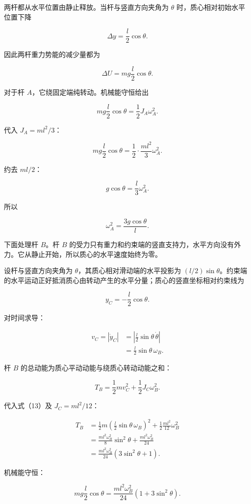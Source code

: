 \documentclass[12pt,a4paper,UTF8]{ctexart}
\begin{document}
两杆都从水平位置由静止释放。当杆与竖直方向夹角为 \(\theta\)
时，质心相对初始水平位置下降

\[
\Delta y=\frac l2\cos\theta. \tag{6}
\]

因此两杆重力势能的减少量都为

\[
\Delta U=mg\frac l2\cos\theta. \tag{7}
\]

对于杆 \(A\)，它绕固定端纯转动。机械能守恒给出

\[
mg\frac l2\cos\theta
=\frac12J_A\omega_A^2. \tag{8}
\]

代入 \(J_A=ml^2/3\)：

\[
mg\frac l2\cos\theta
=\frac12\cdot\frac{ml^2}{3}\omega_A^2. \tag{9}
\]

约去 \(ml/2\)：

\[
g\cos\theta=\frac l3\omega_A^2. \tag{10}
\]

所以

\[
\omega_A^2=\frac{3g\cos\theta}{l}. \tag{11}
\]

下面处理杆 \(B\)。杆 \(B\)
的受力只有重力和约束端的竖直支持力，水平方向没有外力。它从静止开始，所以质心的水平速度始终为零。

设杆与竖直方向夹角为 \(\theta\)，其质心相对滑动端的水平投影为
\((l/2)\sin\theta\)。约束端的水平运动正好抵消质心由转动产生的水平分量；质心的竖直坐标相对约束线为

\[
y_C=-\frac l2\cos\theta. \tag{12}
\]

对时间求导：

\[
\begin{aligned}
v_C
=|\dot y_C|
&=\left|\frac l2\sin\theta\,\dot\theta\right|\\
&=\frac l2\sin\theta\,\omega_B.
\end{aligned} \tag{13}
\]

杆 \(B\) 的总动能为质心平动动能与绕质心转动动能之和：

\[
T_B=\frac12mv_C^2+\frac12J_C\omega_B^2. \tag{14}
\]

代入式（13）及 \(J_C=ml^2/12\)：

\[
\begin{aligned}
T_B
&=\frac12m\left(\frac l2\sin\theta\,\omega_B\right)^2
+\frac12\frac{ml^2}{12}\omega_B^2\\
&=\frac{ml^2\omega_B^2}{8}\sin^2\theta
+\frac{ml^2\omega_B^2}{24}\\
&=\frac{ml^2\omega_B^2}{24}
(3\sin^2\theta+1).
\end{aligned} \tag{15}
\]

机械能守恒：

\[
mg\frac l2\cos\theta
=\frac{ml^2\omega_B^2}{24}
(1+3\sin^2\theta). \tag{16}
\]
\end{document}
